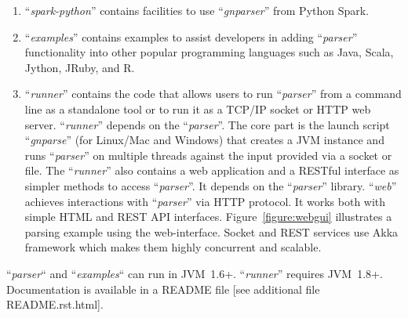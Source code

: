 \documentclass{bmcart}
\begin{document}
\begin{enumerate}
  \item ``\textit{spark-python}'' contains facilities to use
  ``\textit{gnparser}'' from Python Spark. 

  \item ``\textit{examples}'' contains examples to assist developers in adding
    ``\textit{parser}'' functionality into other popular programming languages
    such as Java, Scala, Jython, JRuby, and R.

  \item ``\textit{runner}'' contains the code that allows users to run
    ``\textit{parser}'' from a command line as a standalone tool or to run it as
    a TCP/IP socket or HTTP web server. ``\textit{runner}'' depends on the
    ``\textit{parser}''. The core part is the launch script ``\textit{gnparse}''
    (for Linux/Mac and Windows) that creates a JVM instance and runs
    ``\textit{parser}'' on multiple threads against the input provided via a
    socket or file. The ``\textit{runner}'' also contains a web application and
    a RESTful interface as simpler methods to access ``\textit{parser}''. It
    depends on the ``\textit{parser}'' library.  ``\textit{web}'' achieves
    interactions with ``\textit{parser}'' via HTTP protocol. It works both with
    simple HTML and REST API interfaces.  Figure~\ref{figure:webgui} illustrates
    a parsing example using the web-interface. Socket and REST services use Akka
    framework which makes them highly concurrent and scalable.

\end{enumerate}

``\textit{parser}`` and ``\textit{examples}`` can run in JVM~1.6+.
``\textit{runner}'' requires JVM~1.8+. Documentation is available in a README
file [see additional file README.rst.html].
\end{document}
